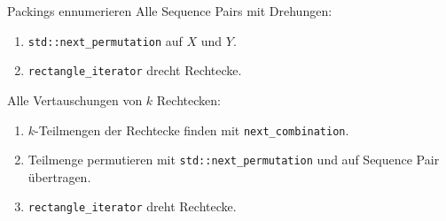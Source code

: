 \documentclass{beamer}
\begin{document}
\begin{frame}{Packings ennumerieren}
 Alle Sequence Pairs mit Drehungen:
 \begin{enumerate}
   \item \texttt{std::next\_permutation} auf $X$ und $Y$.
   \item \texttt{rectangle\_iterator} drecht Rechtecke.
 \end{enumerate}
 
 Alle Vertauschungen von $k$ Rechtecken:
 \begin{enumerate}
   \item $k$-Teilmengen der Rechtecke finden mit \texttt{next\_combination}.
   \item Teilmenge permutieren mit \texttt{std::next\_permutation} und auf Sequence Pair übertragen. 
   \item \texttt{rectangle\_iterator} dreht Rechtecke.
 \end{enumerate}


\end{frame}
\end{document}
